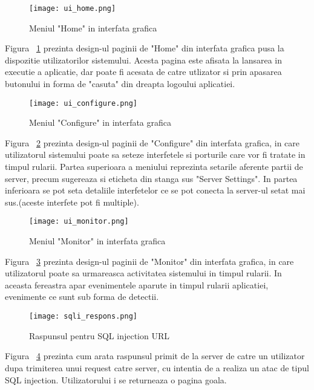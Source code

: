 \begin{figure}[h]
	\centering
	\texttt{[image: ui\_home.png]}
	\caption{Meniul "Home" in interfata grafica}
	\label{fig:ui_home}
\end{figure}
Figura ~\ref{fig:ui_home} prezinta design-ul paginii de "Home" din interfata grafica pusa la dispozitie utilizatorilor sistemului. Acesta pagina este afisata la lansarea in executie a aplicatie, dar poate fi acesata de catre utlizator si prin apasarea butonului in forma de "casuta" din dreapta logoului aplicatiei.\\

\begin{figure}[h]
	\centering
	\texttt{[image: ui\_configure.png]}
	\caption{Meniul "Configure" in interfata grafica}
	\label{fig:ui_configure}
\end{figure}
Figura ~\ref{fig:ui_configure} prezinta design-ul paginii de "Configure" din interfata grafica, in care utilizatorul sistemului poate sa seteze interfetele si porturile care vor fi tratate in timpul rularii. Partea superioara a meniului reprezinta setarile aferente partii de server, precum sugereaza si eticheta din stanga sus "Server Settings". In partea inferioara se pot seta detaliile interfetelor ce se pot conecta la server-ul setat mai sus.(aceste interfete pot fi multiple). \\

\begin{figure}[h]
	\centering
	\texttt{[image: ui\_monitor.png]}
	\caption{Meniul "Monitor" in interfata grafica}
	\label{fig:ui_monitor}
\end{figure}
Figura ~\ref{fig:ui_monitor} prezinta design-ul paginii de "Monitor" din interfata grafica, in care utilizatorul poate sa urmareasca activitatea sistemului in timpul rularii. In aceasta fereastra apar evenimentele aparute in timpul rularii aplicatiei, evenimente ce sunt sub forma de detectii.\\

\begin{figure}[h]
	\centering
	\texttt{[image: sqli\_respons.png]}
	\caption{Raspunsul pentru SQL injection URL}
	\label{fig:sqli_respons}
\end{figure}

Figura ~\ref{fig:sqli_respons} prezinta cum arata raspunsul primit de la server de catre un utilizator dupa trimiterea unui request catre server, cu intentia de a realiza un atac de tipul SQL injection. Utilizatorului i se returneaza o pagina goala.\\
\newpage

